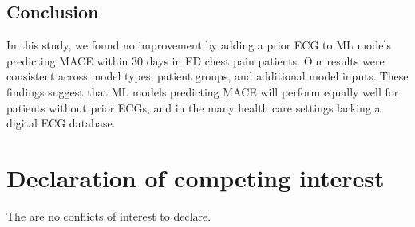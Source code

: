 \documentclass[preprint]{elsarticle}
\begin{document}
\subsection{Conclusion}
In this study, we found no improvement by adding a prior ECG to ML models predicting MACE within 30 days in ED chest pain patients. Our results were consistent across model types, patient groups, and additional model inputs. These findings suggest that ML models predicting MACE will perform equally well for patients without prior ECGs, and in the many health care settings lacking a digital ECG database.

\section*{Declaration of competing interest}
The are no conflicts of interest to declare.







\end{document}

